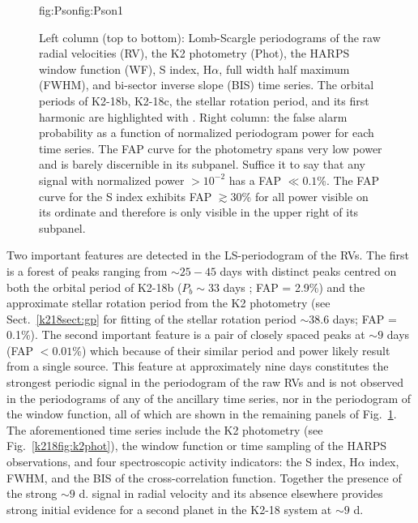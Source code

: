 \begin{figure}
\begin{ocg}{fig:Pson}{fig:Pson}{1}
  \end{ocg}
  \hspace{-0.8\hsize}%
  \caption[Lomb-Scargle periodograms of the HARPS timeseries and K2 photometry.]
  {\small Left column (top to bottom):
  Lomb-Scargle periodograms of the raw radial velocities (RV), the K2 photometry (Phot), the HARPS window
  function (WF), S index, H$\alpha$, full width half maximum (FWHM), and bi-sector inverse slope (BIS)
  time series. The orbital periods of K2-18b, K2-18c, the stellar rotation
  period, and its first harmonic are highlighted with
  .
  Right column: the false alarm probability as a function of normalized periodogram power for each
  time series. The FAP curve for the photometry spans very low power and is barely discernible in its
  subpanel. Suffice it to say that any signal with normalized power $> 10^{-2}$ has a FAP $\ll 0.1$\%.
  The FAP curve for the S index exhibits FAP $\gtrsim 30$\% for all power visible on its ordinate and 
  therefore is only visible in the upper right of its subpanel.}
  \label{k218fig:periodograms}
\end{figure}


Two important features are detected in the LS-periodogram of the RVs.
The first is a forest of peaks ranging from 
$\sim 25-45$ days with distinct peaks centred on both the orbital period of K2-18b
($P_b \sim 33$ days ; FAP = 2.9\%) and the approximate stellar
rotation period from the K2 photometry (see Sect.~\ref{k218sect:gp} for fitting of the
stellar rotation period \prot{} $\sim 38.6$ days;
FAP = 0.1\%). The second important feature is a pair of closely spaced peaks
at $\sim 9$ days (FAP $<0.01$\%) which because of their similar period and power
likely result from a single source. This feature at approximately nine days
constitutes the strongest periodic signal in the
periodogram of the raw RVs and is not observed in the periodograms of any of the ancillary
time series, nor in the periodogram of the window function, all of which are
shown in the remaining panels of Fig.~\ref{k218fig:periodograms}. The aforementioned time series
include the K2 photometry (see Fig.~\ref{k218fig:k2phot}), the window function or
time sampling of the HARPS observations, and four spectroscopic activity indicators:
the S index, H$\alpha$ index, FWHM, and the BIS of the cross-correlation function. 
Together the presence of the strong $\sim 9$ d. signal in radial velocity
and its absence elsewhere provides strong initial evidence for a second planet in the K2-18
system at $\sim 9$ d.


